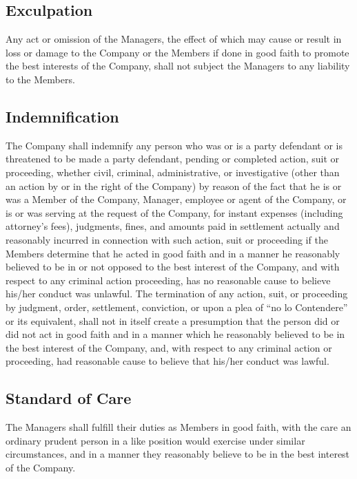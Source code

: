 \documentclass[11pt,onecolumn]{article}
\begin{document}
\subsection{Exculpation}

Any act or omission of the Managers, the effect of which may cause or result in loss or damage to the Company or the Members if done in good faith to promote the best interests of the Company, shall not subject the Managers to any liability to the Members.

\subsection{Indemnification}

The Company shall indemnify any person who was or is a party defendant or is threatened to be made a party defendant, pending or completed action, suit or proceeding, whether civil, criminal, administrative, or investigative (other than an action by or in the right of the Company) by reason of the fact that he is or was a Member of the Company, Manager, employee or agent of the Company, or is or was serving at the request of the Company, for instant expenses (including attorney's fees), judgments, fines, and amounts paid in settlement actually and reasonably incurred in connection with such action, suit or proceeding if the Members determine that he acted in good faith and in a manner he reasonably believed to be in or not opposed to the best interest of the Company, and with respect to any criminal action proceeding, has no reasonable cause to believe his/her conduct was unlawful. The termination of any action, suit, or proceeding by judgment, order, settlement, conviction, or upon a plea of ``no lo Contendere'' or its equivalent, shall not in itself create a presumption that the person did or did not act in good faith and in a manner which he reasonably believed to be in the best interest of the Company, and, with respect to any criminal action or proceeding, had reasonable cause to believe that his/her conduct was lawful.

\subsection{Standard of Care}

The Managers shall fulfill their duties as Members in good faith, with the care an ordinary prudent person in a like position would exercise under similar circumstances, and in a manner they reasonably believe to be in the best interest of the Company.
\end{document}
